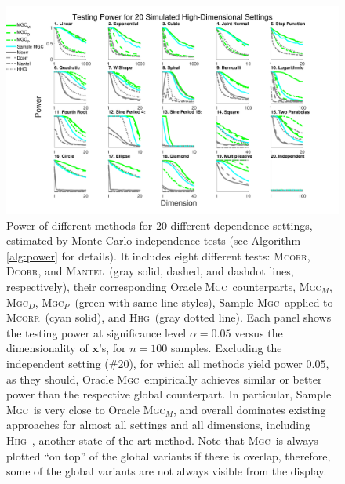 \documentclass[11pt]{article}
\providecommand{\sct}[1]{{\normalfont\textsc{#1}}}
\providecommand{\mb}[1]{\boldsymbol{#1}}
\newcommand{\Mgc}{\sct{Mgc}}
\newcommand{\Mgcp}{\sct{Mgc$_P$}}
\newcommand{\Mgcd}{\sct{Mgc$_D$}}
\newcommand{\Mgcm}{\sct{Mgc$_M$}}
\newcommand{\Hhg}{\sct{Hhg}}
\newcommand{\Dcorr}{\sct{Dcorr}}
\newcommand{\Mcorr}{\sct{Mcorr}}
\newcommand{\Mantel}{\sct{Mantel}}
\begin{document}
\begin{figure}[htbp]
\includegraphics[width=1.0\textwidth,trim={0 0.5cm 4cm 0},clip]{Figures/FigHDPowerAll}
\caption{Power of different methods for $20$ different dependence settings, estimated by Monte Carlo independence tests (see Algorithm \ref{alg:power} for details). It includes eight different tests: \Mcorr, \Dcorr, and \Mantel~(gray solid, dashed, and dashdot lines, respectively), their corresponding Oracle \Mgc~counterparts, \Mgcm, \Mgcd, \Mgcp~(green with same line styles), Sample \Mgc~applied to \Mcorr~(cyan solid), and \Hhg~(gray dotted line). 
Each panel shows the testing power at significance level $\alpha=0.05$ versus the dimensionality of $\mb{x}$'s, for $n=100$ samples. 
Excluding the independent setting (\#20), for which all methods yield power $0.05$, as they should, Oracle \Mgc~empirically achieves similar or better power than the respective global counterpart. In particular, Sample \Mgc~is very close to Oracle \Mgcm, and overall dominates existing approaches for almost all settings and all dimensions, including \Hhg~\cite{HellerGorfine2013}, another state-of-the-art method. Note that \Mgc~is always plotted ``on top'' of the global variants if there is overlap, therefore, some of the global variants are not always visible from the display.}
\label{f:nDAll}
\end{figure}
\end{document}
